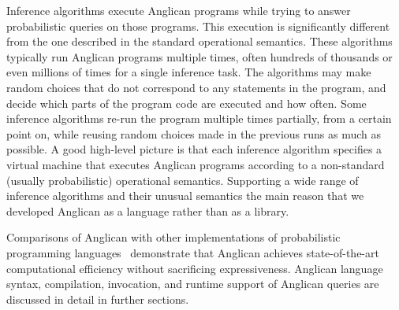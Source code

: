 \documentclass[preprint]{sigplanconf}
\begin{document}
Inference algorithms execute Anglican programs while trying to
answer probabilistic queries on those programs. This execution is
significantly different from the one described in the standard 
operational semantics. These algorithms typically run Anglican programs 
multiple times, often hundreds of thousands or even millions of times 
for a single inference task. The algorithms may make random choices 
that do not correspond to any statements in the program, and decide which parts 
of the program code are executed and how often. Some inference algorithms 
re-run the program multiple times partially, from a certain
point on, while reusing random choices made in the previous runs as much as possible. A good high-level picture is that each inference algorithm specifies a 
virtual machine that executes Anglican programs according to a 
non-standard (usually probabilistic) operational semantics. 
Supporting a wide range of inference algorithms and their unusual semantics 
the main reason that we developed Anglican as a language rather 
than as a library. 


Comparisons of Anglican with other implementations of
probabilistic programming languages~\cite{SGG15}\cite[pp.
32--33]{P16} demonstrate that Anglican achieves state-of-the-art
computational efficiency without sacrificing expressiveness.
Anglican language syntax, compilation, invocation, and runtime
support of Anglican queries are discussed in detail in further
sections.
\end{document}
